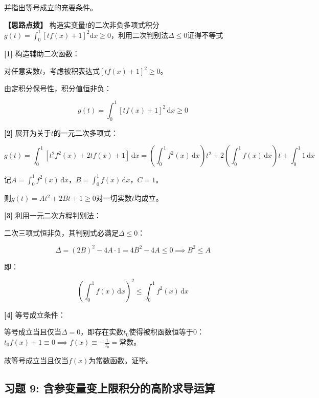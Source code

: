\documentclass[11pt,a4paper,UTF8]{ctexart}
\begin{document}
并指出等号成立的充要条件。

\textbf{\color{DeepPurple}【思路点拨】} 构造实变量$t$的二次非负多项式积分$g(t) = \int_0^1 [t f(x) + 1]^2\mathrm{d}x \ge 0$，利用二次判别法$\Delta \le 0$证得不等式


\begin{solbox}[分步推导与答题规范]
\textbf{[1]} 构造辅助二次函数：

对任意实数$t$，考虑被积表达式$[t f(x) + 1]^2 \ge 0$。

由定积分保号性，积分值恒非负：


\begin{equation*}
g(t) = \int_0^1 [t f(x) + 1]^2\,\mathrm{d}x \ge 0
\end{equation*}


\textbf{[2]} 展开为关于$t$的一元二次多项式：


\begin{equation*}
g(t) = \int_0^1 [t^2 f^2(x) + 2t f(x) + 1]\,\mathrm{d}x = \left(\int_0^1 f^2(x)\,\mathrm{d}x\right) t^2 + 2\left(\int_0^1 f(x)\,\mathrm{d}x\right) t + \int_0^1 1\,\mathrm{d}x
\end{equation*}


记$A = \int_0^1 f^2(x)\,\mathrm{d}x$，$B = \int_0^1 f(x)\,\mathrm{d}x$，$C = 1$。

则$g(t) = A t^2 + 2B t + 1 \ge 0$对一切实数$t$均成立。

\textbf{[3]} 利用一元二次方程判别法：

二次三项式恒非负，其判别式必满足$\Delta \le 0$：


\begin{equation*}
\Delta = (2B)^2 - 4A \cdot 1 = 4B^2 - 4A \le 0 \implies B^2 \le A
\end{equation*}


即：


\begin{equation*}
\left(\int_0^1 f(x)\,\mathrm{d}x\right)^2 \le \int_0^1 f^2(x)\,\mathrm{d}x
\end{equation*}


\textbf{[4]} 等号成立条件：

等号成立当且仅当$\Delta = 0$，即存在实数$t_0$使得被积函数恒等于0：$t_0 f(x) + 1 \equiv 0 \implies f(x) \equiv -\frac{1}{t_0} = \text{常数}$。

故等号成立当且仅当$f(x)$为常数函数。证毕。
\end{solbox}


\subsection{习题 9: 含参变量变上限积分的高阶求导运算}
\end{document}
